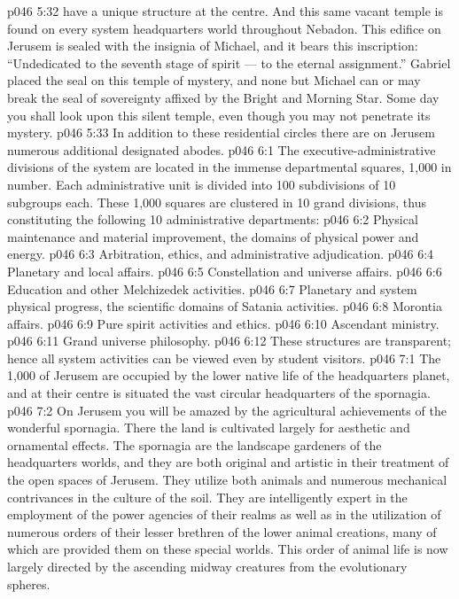 \vs p046 5:32 \bibnobreakspace {} have a unique structure at the centre. And this same vacant temple is found on every system headquarters world throughout Nebadon. This edifice on Jerusem is sealed with the insignia of Michael, and it bears this inscription: “Undedicated to the seventh stage of spirit --- to the eternal assignment.” Gabriel placed the seal on this temple of mystery, and none but Michael can or may break the seal of sovereignty affixed by the Bright and Morning Star. Some day you shall look upon this silent temple, even though you may not penetrate its mystery.
\vs p046 5:33 \pc {} In addition to these residential circles there are on Jerusem numerous additional designated abodes.
\vs p046 6:1 The executive\hyp{}administrative divisions of the system are located in the immense departmental squares, 1,000 in number. Each administrative unit is divided into 100 subdivisions of 10 subgroups each. These 1,000 squares are clustered in 10 grand divisions, thus constituting the following 10 administrative departments:
\vs p046 6:2 \bibnobreakspace Physical maintenance and material improvement, the domains of physical power and energy.
\vs p046 6:3 \bibnobreakspace Arbitration, ethics, and administrative adjudication.
\vs p046 6:4 \bibnobreakspace Planetary and local affairs.
\vs p046 6:5 \bibnobreakspace Constellation and universe affairs.
\vs p046 6:6 \bibnobreakspace Education and other Melchizedek activities.
\vs p046 6:7 \bibnobreakspace Planetary and system physical progress, the scientific domains of Satania activities.
\vs p046 6:8 \bibnobreakspace Morontia affairs.
\vs p046 6:9 \bibnobreakspace Pure spirit activities and ethics.
\vs p046 6:10 \bibnobreakspace Ascendant ministry.
\vs p046 6:11 \bibnobreakspace Grand universe philosophy.
\vs p046 6:12 \pc These structures are transparent; hence all system activities can be viewed even by student visitors.
\vs p046 7:1 The 1,000  of Jerusem are occupied by the lower native life of the headquarters planet, and at their centre is situated the vast circular headquarters of the spornagia.
\vs p046 7:2 On Jerusem you will be amazed by the agricultural achievements of the wonderful spornagia. There the land is cultivated largely for aesthetic and ornamental effects. The spornagia are the landscape gardeners of the headquarters worlds, and they are both original and artistic in their treatment of the open spaces of Jerusem. They utilize both animals and numerous mechanical contrivances in the culture of the soil. They are intelligently expert in the employment of the power agencies of their realms as well as in the utilization of numerous orders of their lesser brethren of the lower animal creations, many of which are provided them on these special worlds. This order of animal life is now largely directed by the ascending midway creatures from the evolutionary spheres.
